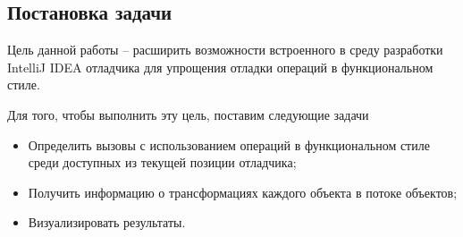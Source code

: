 \subsection{Постановка задачи}
Цель данной работы -- расширить возможности встроенного в среду разработки IntelliJ IDEA отладчика для упрощения отладки операций в функциональном стиле.

Для того, чтобы выполнить эту цель, поставим следующие задачи
\begin{itemize}
	\item Определить вызовы с использованием операций в функциональном стиле среди доступных из текущей позиции отладчика;
	\item Получить информацию о трансформациях каждого объекта в потоке объектов;
	\item Визуализировать результаты.
\end{itemize}

